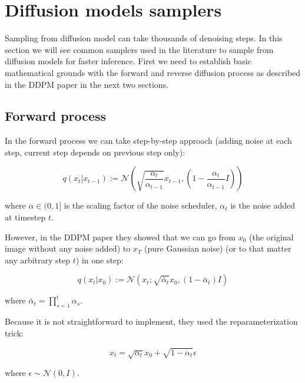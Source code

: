 \section{Diffusion models samplers}
\label{appendix:dm_samplers}

Sampling from diffusion model can take thousands of denoising steps. In this section we will see common samplers used in the literature to sample from diffusion models for faster inference. First we need to establish basic mathematical grounds with the forward and reverse diffusion process as described in the DDPM paper \cite{ddpm} in the next two sections.








\subsection*{Forward process}

In the forward process we can take step-by-step approach (adding noise at each step, current step depends on previous step only):

\[ q(x_t | x_{t-1}) := \mathcal{N} \left( \sqrt{\frac{\alpha_t}{\alpha_{t-1}}} x_{t-1}, \left( 1 - \frac{\alpha_t}{\alpha_{t-1}} I \right) \right) \]

where $\alpha \in (0, 1]$ is the scaling factor of the noise scheduler, $\alpha_t$ is the noise added at timestep $t$.

However, in the DDPM paper \cite{ddpm} they showed that we can go from $x_0$ (the original image without any noise added) to $x_T$ (pure Gaussian noise) (or to that matter any arbitrary step $t$) in one step:

\[ q(x_t | x_0) := \mathcal{N} \left( x_t; \sqrt{\bar{\alpha}_t} x_0, (1 - \bar{\alpha}_t) I \right) \]

where $\bar{\alpha}_t = \prod_{s=1}^{t} \alpha_s$.

Because it is not straightforward to implement, they used the reparameterization trick:

\begin{equation}
    x_t = \sqrt{\alpha_t} x_0 + \sqrt{1 - \alpha_t} \epsilon
    \label{eq:appendix_ddpm_reparam_trick}
\end{equation}

where $\epsilon \sim \mathcal{N} (0, I)$. 








